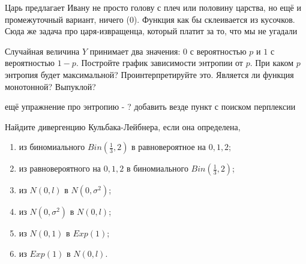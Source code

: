 
\begin{problem}
	Царь предлагает Ивану не просто голову с плеч или половину царства, но ещё и промежуточный вариант, ничего (0). Функция как бы склеивается из кусочков. Сюда же задача про царя-извращенца, который платит за то, что мы не угадали
	\begin{sol} 
		
		
	\end{sol} 
\end{problem}


\begin{problem}
Случайная величина $Y$ принимает два значения: $0$ с вероятностью $p$ и $1$ с вероятностью $1-p$. Постройте график зависимости энтропии от $p$. При каком $p$ энтропия будет максимальной? Проинтерпретируйте это. Является ли функция монотонной? Выпуклой? 	
\begin{sol} 
	
\end{sol} 
\end{problem}


\begin{problem}
	ещё упражнение про энтропию - ?  
	добавить везде пункт с поиском перплексии 
	\begin{sol} 
		
	\end{sol} 
\end{problem}

  
 \begin{problem}
Найдите дивергенцию Кульбака-Лейбнера, если она определена, 

\begin{enumerate}
\item  из биномиального $Bin(\frac{1}{3}, 2)$ в равновероятное на $0,1,2$;
\item из равновероятного на $0,1,2$ в биномиального $Bin(\frac{1}{3}, 2)$;
\item из $N(0,l)$ в $N(0, \sigma^2)$;
\item из  $N(0, \sigma^2)$ в $N(0,l)$;
\item из $N(0,1)$ в $Exp(1)$;
\item из $Exp(1)$ в $N(0,l)$. 
\end{enumerate}

	\begin{sol} 
		
	\end{sol} 
\end{problem}



